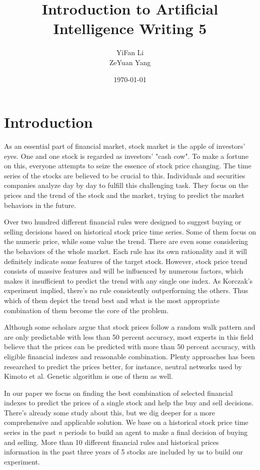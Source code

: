 \documentclass{article}
\title{Introduction to Artificial Intelligence Writing 5}
\author{YiFan Li\\ZeYuan Yang}
\date{\today}
\begin{document}
\maketitle
{}



\section{Introduction}

As an essential part of financial market, stock market is the apple of investors' eyes.
One and one stock is regarded as investors' "cash cow".
To make a fortune on this, everyone attempts to seize the essence of stock price changing.
The time series of the stocks are believed to be crucial to this.
Individuals and securities companies analyze day by day to fulfill this challenging task.
They focus on the prices and the trend of the stock and the market,
trying to predict the market behaviors in the future.

Over two hundred different financial rules were designed to suggest buying or selling decisions based on historical stock price time series. \cite{stock-timing-using-genetic-algorithms}
Some of them focus on the numeric price, while some value the trend.
There are even some considering the behaviors of the whole market.
Each rule has its own rationality and it will definitely indicate some features of the target stock.
However, stock price trend consists of massive features and will be influenced by numerous factors,
which makes it insufficient to predict the trend with any single one index.
As Korczak's experiment implied, there's no rule consistently outperforming the others. \cite{korczak2002stock}
Thus which of them depict the trend best and what is the most appropriate combination of them become the core of the problem.

Although some scholars argue that stock prices follow a random walk pattern and are only predictable with less than 50 percent accuracy,
most experts in this field believe that the prices can be predicted with more than 50 percent accuracy,
with eligible financial indexes and reasonable combination. \cite{Qian2007}
Plenty approaches has been researched to predict the prices better, for instance, neutral networks used by Kimoto et al. \cite{5726498}
Genetic algorithm is one of them as well.

In our paper we focus on finding the best combination of selected financial indexes to predict the prices of a single stock
and help the buy and sell decisions.
There's already some study about this, but we dig deeper for a more comprehensive and applicable solution. \cite{genetic-algorithms-for-predicting-the-egyptian-stock-market} \cite{genetic-algorithms-to-optimise-the-time-to-make-stock-market-investment}
We base on a historical stock price time series in the past \emph{n} periods to build an agent to make a final decision of buying and selling.
More than 10 different financial rules and historical prices information in the past three years of 5 stocks are included by us to build our experiment.
\end{document}
